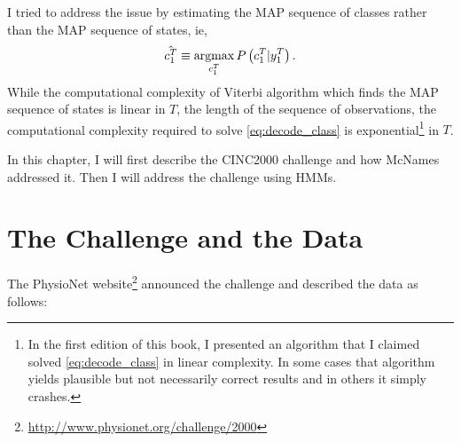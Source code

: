 I tried to address the issue by estimating the MAP sequence of classes
rather than the MAP sequence of states, ie,
\begin{equation}
  \label{eq:decode_class}
  \hat {c_{1}^{T}} \equiv
  \operatorname*{argmax}_{c_{1}^{T}}P\left(c_{1}^{T} | y_{1}^{T}\right).
\end{equation}
While the computational complexity of Viterbi algorithm which finds
the MAP sequence of states is linear in $T$, the length of the
sequence of observations, the computational complexity required to
solve \eqref{eq:decode_class} is exponential\footnote{In the first
  edition of this book, I presented an algorithm that I claimed solved
  \eqref{eq:decode_class} in linear complexity.  In some cases that
  algorithm yields plausible but not necessarily correct results and
  in others it simply crashes.} in $T$.

In this chapter, I will first describe the CINC2000 challenge and how
McNames addressed it.  Then I will address the challenge using HMMs.

\section{The  Challenge and the Data}
\label{sec:challenge}

The PhysioNet
website\footnote{\url{http://www.physionet.org/challenge/2000}}
announced the challenge and described the data as follows:


